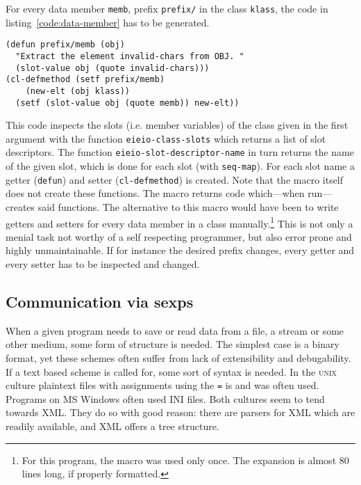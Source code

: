 \documentclass[a4paper,10pt,twoside]{report}
\newcommand{\sym}[1]{\texttt{#1}}
\newcommand{\fun}[1]{\texttt{#1}}
\newcommand{\unix}{\textsc{unix}}
\newcommand{\windows}{MS Windows\texttrademark}
\begin{document}
For every data member \sym{memb}, prefix \sym{prefix/} in the class \sym{klass},
the code in listing~\ref{code:data-member} has to be generated.

\begin{lstlisting}[style=lispcode,caption={Getter and Setter for a member called
  \sym{memb}.},label={code:data-member}]
(defun prefix/memb (obj)
  "Extract the element invalid-chars from OBJ. "
  (slot-value obj (quote invalid-chars)))
(cl-defmethod (setf prefix/memb)
    (new-elt (obj klass))
  (setf (slot-value obj (quote memb)) new-elt))
\end{lstlisting}

This code inspects the slots (i.e. member variables) of the class given in the
first argument with the function \fun{eieio-class-slots} which returns a list of
slot descriptors.  The function \fun{eieio-slot-descriptor-name} in turn returns
the name of the given slot, which is done for each slot (with \fun{seq-map}).
For each slot name a getter (\fun{defun}) and setter (\fun{cl-defmethod}) is
created.  Note that the macro itself does not create these functions.  The macro
returns code which---when run---creates said functions.  The alternative to this
macro would have been to write getters and setters for every data member in a
class manually.\footnote{For this program, the macro was used only once.  The
  expansion is almost 80 lines long, if properly formatted.}  This is not only a
menial task not worthy of a self respecting programmer, but also error prone and
highly unmaintainable.  If for instance the desired prefix changes, every getter
and every setter has to be inspected and changed.

\subsection{Communication via sexps}
\label{subsec:sexp-communication}

When a given program needs to save or read data from a file, a stream or some
other medium, some form of structure is needed.  The simplest case is a binary
format, yet these schemes often suffer from lack of extensibility and
debugability.  If a text based scheme is called for, some sort of syntax is
needed.  In the \unix{} culture plaintext files with assignments using the
\texttt{=} is and was often used.  Programs on \windows{} often used INI files.
Both cultures seem to tend towards XML.  They do so with good reason: there are
parsers for XML which are readily available, and XML offers a tree structure.
\end{document}
